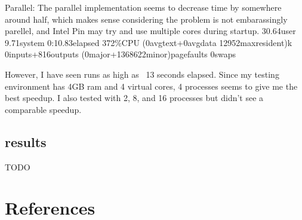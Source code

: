 \documentclass[11pt,expanded,copyright]{fsuthesis}
\begin{document}
Parallel:
The parallel implementation seems to decrease time by somewhere around half, which makes sense considering the problem is not embarassingly parellel, and Intel Pin may try and use multiple cores during startup.
30.64user 9.71system 0:10.83elapsed 372\%CPU (0avgtext+0avgdata 12952maxresident)k
0inputs+816outputs (0major+1368622minor)pagefaults 0swaps

However, I have seen runs as high as ~13 seconds elapsed. Since my testing environment has 4GB ram and 4 virtual cores, 4 processes seems to give me the best speedup. I also tested with 2, 8, and 16 processes but didn't see a comparable speedup.

%

\section{results}

TODO


	
\chapter{References}
\end{document}
